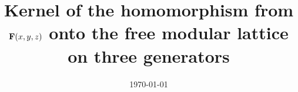   \theoremstyle{plain}
  \newtheorem{theorem}{Theorem}[section]
  \newtheorem{lemma}[theorem]{Lemma}
  \newtheorem{proposition}[theorem]{Proposition}
  \newtheorem{prop}[theorem]{Prop.}
  \theoremstyle{definition}
  \newtheorem{conjecture}{Conjecture}
  \newtheorem{claim}[theorem]{Claim}
  \newtheorem{subclaim}{Subclaim}
  \newtheorem{corollary}[theorem]{Corollary}
  \newtheorem{definition}[theorem]{Definition}
  \newtheorem{notation}[theorem]{Notation}
  \newtheorem{Fact}[theorem]{Fact}
  \newtheorem*{fact}{Fact}
  \newtheorem{example}[theorem]{Example}
  \newtheorem{examples}[theorem]{Examples}
  \newtheorem{exercise}{Exercise}
  \newtheorem*{lem}{Lemma}
  \newtheorem*{cor}{Corollary}
  \newtheorem*{remark}{Remark}
  \newtheorem*{remarks}{Remarks}
  \newtheorem*{obs}{Observation}
  
  \title[Kernel of $\alg F(x,y,z) \twoheadrightarrow \alg F_{\alg M_3}(0,1,2)$]{Kernel of the homomorphism from $\mathbf{F} (x,y,z)$ onto the
  free modular lattice on three generators}
  
  
  
  
  \date{\today}
  
  
  
  \maketitle
  
